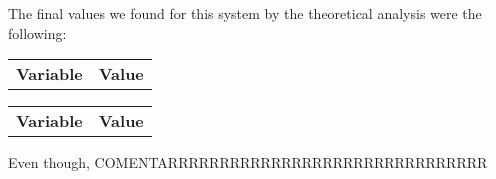 The final values we found for this system by the theoretical analysis were the following:

\begin{tabular}{|l|r|}
	\hline    
    {\bf Variable} & {\bf Value} \\ %
\end{tabular}

\begin{tabular}{|l|r|}
    \hline    
    {\bf Variable} & {\bf Value} \\ %
\end{tabular}

Even though, COMENTARRRRRRRRRRRRRRRRRRRRRRRRRRRRRRR